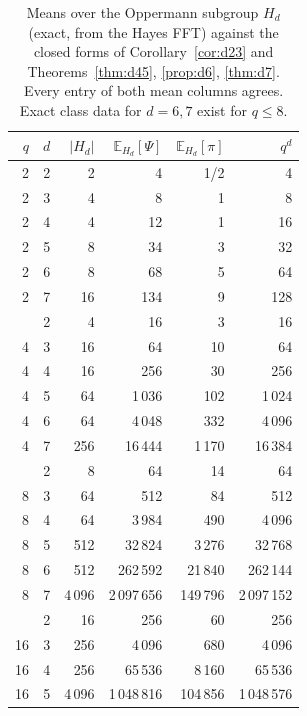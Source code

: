 \begin{table}[tbp]
\centering
\caption{Means over the Oppermann subgroup $H_d$ (exact, from the Hayes FFT) against the closed forms of Corollary~\ref{cor:d23} and Theorems~\ref{thm:d45}, \ref{prop:d6}, \ref{thm:d7}. Every entry of both mean columns agrees. Exact class data for $d=6,7$ exist for $q\le8$.}\label{tab:means}
\begin{tabular}{rrrrrr}
\toprule
$q$ & $d$ & $|H_d|$ & $\mathbb{E}_{H_d}[\Psi]$ & $\mathbb{E}_{H_d}[\pi]$ & $q^d$\\
\midrule
2 & 2 & 2 & 4 & 1/2 & 4\\
2 & 3 & 4 & 8 & 1 & 8\\
2 & 4 & 4 & 12 & 1 & 16\\
2 & 5 & 8 & 34 & 3 & 32\\
2 & 6 & 8 & 68 & 5 & 64\\
2 & 7 & 16 & 134 & 9 & 128\\
\addlinespace
4 & 2 & 4 & 16 & 3 & 16\\
4 & 3 & 16 & 64 & 10 & 64\\
4 & 4 & 16 & 256 & 30 & 256\\
4 & 5 & 64 & 1\,036 & 102 & 1\,024\\
4 & 6 & 64 & 4\,048 & 332 & 4\,096\\
4 & 7 & 256 & 16\,444 & 1\,170 & 16\,384\\
\addlinespace
8 & 2 & 8 & 64 & 14 & 64\\
8 & 3 & 64 & 512 & 84 & 512\\
8 & 4 & 64 & 3\,984 & 490 & 4\,096\\
8 & 5 & 512 & 32\,824 & 3\,276 & 32\,768\\
8 & 6 & 512 & 262\,592 & 21\,840 & 262\,144\\
8 & 7 & 4\,096 & 2\,097\,656 & 149\,796 & 2\,097\,152\\
\addlinespace
16 & 2 & 16 & 256 & 60 & 256\\
16 & 3 & 256 & 4\,096 & 680 & 4\,096\\
16 & 4 & 256 & 65\,536 & 8\,160 & 65\,536\\
16 & 5 & 4\,096 & 1\,048\,816 & 104\,856 & 1\,048\,576\\
\bottomrule
\end{tabular}
\end{table}
